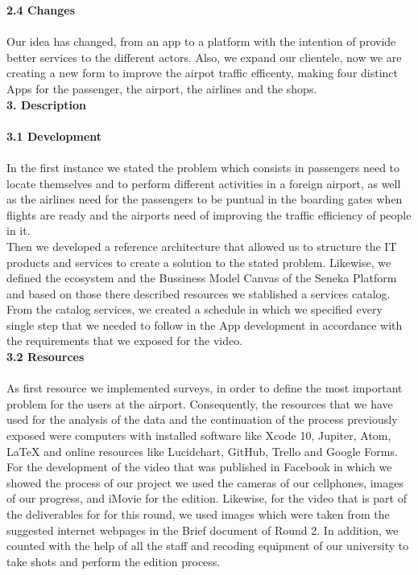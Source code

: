 \documentclass[]{article}
\begin{document}
\Large{\textbf{2.4 Changes}\\}\\
Our idea has changed, from an app to a platform with the intention of provide better services to the different actors. Also, we expand our clientele, now we are creating a new form to improve the airpot traffic efficenty, making four distinct Apps for the passenger, the airport, the airlines and the shops.\\
[0.7cm]

\Large{\textbf{3. Description}\\}\\

\Large{\textbf{3.1 Development}\\}\\

In the first instance we stated the problem which consists in passengers need to locate themselves and to perform different activities in a foreign airport, as well as the airlines need for the passengers to be puntual in the boarding gates when flights are ready and the airports need of improving the traffic efficiency of people in it.\\

Then we developed a reference architecture that allowed us to structure the IT products and services to create a solution to the stated problem. Likewise, we defined the ecosystem and the Bussiness Model Canvas of the Seneka Platform and based on those there described resources we  stablished a services catalog.\\

From the catalog services, we created a schedule in which we specified every single step that we needed to follow in the App development in accordance with the requirements that we exposed for the video.\\
[0.6cm]

\Large{\textbf{3.2 Resources}\\}\\

As first resource we implemented surveys, in order to define the most important problem for the users at the airport. Consequently,  the resources that we have used for the analysis of the data and the continuation of the process previously exposed were computers with installed software like Xcode 10, Jupiter, Atom, LaTeX and online resources like Lucidchart, GitHub, Trello and Google Forms.\\  

For the development of the video that was published in Facebook in which we showed the process of our project we used the cameras of our cellphones, images of our progress, and iMovie for the edition. Likewise, for the video that is part of the deliverables for for this round, we used images which were taken from the suggested internet webpages in the Brief document of Round 2. In addition, we counted with the help of all the staff and recoding equipment of our university to take shots and perform the edition process.\\ 
\end{document}
